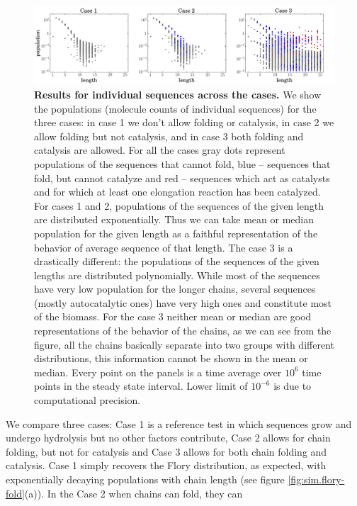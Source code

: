 \documentclass[5p,times]{elsarticle}
\begin{document}
\begin{figure}[htb!]
  \centering
  \includegraphics[width=\textwidth]{pictures/scatter-all-three.pdf}
  \caption{\footnotesize{\textbf{Results for 
individual sequences across the cases.} We show the populations (molecule counts of individual 
sequences) for the three cases: in case 1 we don't allow folding or catalysis, in case 2 
we allow folding but not catalysis, and in case 3 both folding and catalysis are allowed. For 
all the cases gray dots represent populations of the sequences that cannot fold, 
blue -- sequences that fold, but cannot 
catalyze and red -- sequences which act as catalysts and for which at least one elongation 
reaction 
has been catalyzed.  For cases 1 and 2, populations of the sequences of the given length are 
distributed exponentially. Thus we can take mean or median population for the given length as a 
faithful representation of the behavior of average sequence of that length. The case 3 is a 
drastically different: the populations of the sequences of the given lengths are distributed 
polynomially. While most of the sequences have very low population for the longer chains, 
several sequences (mostly autocatalytic ones) have very high ones and constitute most of the 
biomass. 
For the case 3 neither mean or median are good representations of the behavior of the chains, 
as we can see from the figure, all the chains basically separate into two groups with different 
distributions, this information cannot be shown in the mean or median.  Every 
point on the panels is a time average over $10^6$ time points in the steady state interval. Lower 
limit of $10^{-6}$ is due to computational precision.}}
  \label{fig:stats-scatter-018}
\end{figure}
 We compare three cases:  Case 1 is a reference test in which sequences grow and undergo hydrolysis 
but no other factors 
contribute, Case 2 allows for chain folding, but not for catalysis and Case 3 allows for both chain 
folding and catalysis.  Case  1 simply recovers the Flory distribution, as expected, with 
exponentially decaying populations with chain 
length (see figure \ref{fig:sim.flory-fold}(a)).  In the Case 2 when chains can fold, they can 
\end{document}
